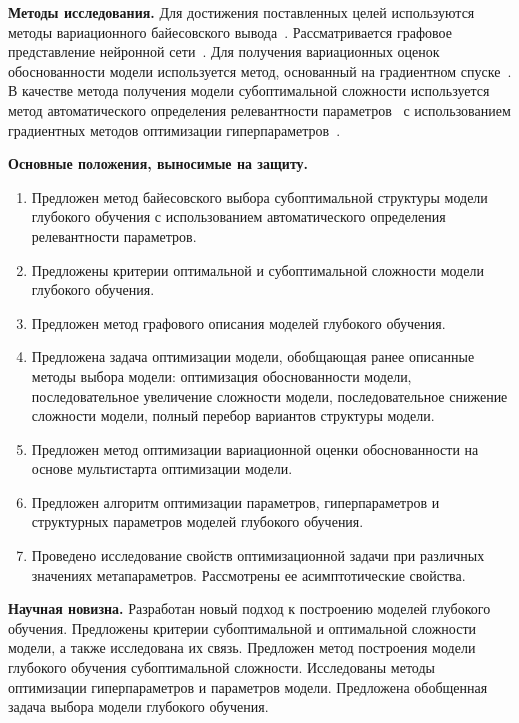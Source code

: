 \vspace{0.5cm}
\textbf{Методы исследования.} Для достижения поставленных целей используются методы вариационного байесовского вывода~\cite{mackay, bishop, early}. Рассматривается графовое представление нейронной сети~\cite{reinf,darts}. Для получения вариационных оценок обоснованности модели используется метод, основанный на градиентном спуске~\cite{sgd_cont, early}. В качестве метода получения модели субоптимальной сложности используется метод автоматического определения релевантности параметров~\cite{mackay,vae_ard} с использованием градиентных методов оптимизации гиперпараметров~\cite{hyper, hyper2, greed_hyper, approx_hyper}.

\vspace{0.5cm}
\textbf{Основные положения, выносимые на защиту.}
\vspace{0.3cm}
\begin{enumerate}
\item Предложен метод байесовского выбора субоптимальной структуры модели
глубокого обучения с использованием автоматического определения
релевантности параметров.
\item Предложены критерии оптимальной и субоптимальной сложности модели глубокого обучения.
\item Предложен метод графового описания моделей глубокого обучения.
\item Предложена задача оптимизации модели, обобщающая ранее
описанные методы выбора модели:
оптимизация обоснованности модели,
последовательное увеличение сложности модели,
последовательное снижение сложности модели,
полный перебор вариантов структуры модели.
\item Предложен метод оптимизации вариационной оценки обоснованности на основе мультистарта оптимизации модели.
\item Предложен алгоритм оптимизации параметров, гиперпараметров и структурных параметров моделей глубокого обучения.
\item Проведено исследование свойств оптимизационной задачи при различных значениях метапараметров. Рассмотрены ее асимптотические свойства.
\end{enumerate}


\vspace{0.5cm}
\textbf{Научная новизна.} Разработан новый подход к построению моделей глубокого обучения. Предложены критерии субоптимальной и оптимальной сложности модели, а также исследована их связь. Предложен метод построения модели глубокого обучения субоптимальной сложности. Исследованы методы оптимизации гиперпараметров и параметров модели.  Предложена обобщенная задача выбора модели глубокого обучения.

